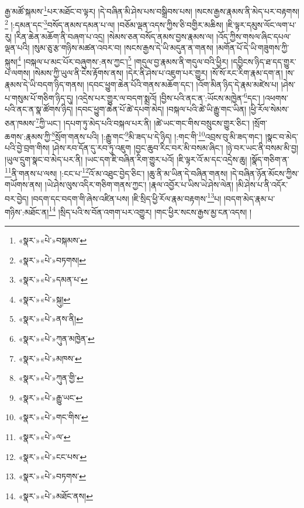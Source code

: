 རྒྱ་མཚོ་སྐམས་\footnote{«སྣར་»«པེ་»བསྐམས་}པར་མཐོང་བ་ལྟར། །དེ་བཞིན་མི་ཤེས་པས་བསྒྲིབས་པས། །སངས་རྒྱས་རྣམས་ནི་མེད་པར་བརྟགས།\footnote{«སྣར་»«པེ་»བཏགས།} །:དམན་དང་\footnote{«སྣར་»«པེ་»དམན་པ་}བསོད་ནམས་དམན་པ་ལ། །བཅོམ་ལྡན་འདས་ཀྱིས་ཅི་བགྱིར་མཆིས། །ཇི་ལྟར་དམུས་ལོང་ལག་པ་རུ། །རིན་ཆེན་མཆོག་ནི་བཞག་པ་འདྲ། །སེམས་ཅན་བསོད་ནམས་བྱས་རྣམས་ལ། །འོད་ཀྱིས་གསལ་ཞིང་དཔལ་ལྡན་པའི། །སུམ་ཅུ་རྩ་གཉིས་མཚན་འབར་བ། །སངས་རྒྱས་དེ་ཡི་མདུན་ན་གནས། །མགོན་པོ་དེ་ཡི་གཟུགས་ཀྱི་སྐུས།\footnote{«སྣར་»«པེ་»སྐུ།} །བསྐལ་པ་མང་པོར་བཞུགས་:ནས་ཀྱང་།\footnote{«སྣར་»«པེ་»ནས་ནི།} །གདུལ་བྱ་རྣམས་ནི་གདུལ་བའི་ཕྱིར། །དབྱིངས་ཉིད་ཐ་དད་གྱུར་པ་ལགས། །སེམས་ཀྱི་ཡུལ་ནི་ངེས་རྟོགས་ནས། །དེར་ནི་ཤེས་པ་འཇུག་པར་གྱུར། །སོ་སོ་རང་རིག་རྣམ་དག་ན། །ས་རྣམས་དེ་ཡི་བདག་ཉིད་གནས། །དབང་ཕྱུག་ཆེན་པོའི་གནས་མཆོག་དང་། །འོག་མིན་ཉིད་དེ་རྣམ་མཛེས་པ། །ཤེས་པ་གསུམ་པོ་གཅིག་ཉིད་དུ། །འདྲེས་པར་གྱུར་ལ་བདག་སྨྲའོ། །བྱིས་པའི་ནང་ན་:ཡོངས་མཁྱེན་\footnote{«སྣར་»«པེ་»ཀུན་མཁྱེན་}དང་། །འཕགས་པའི་ནང་ན་སྣ་ཚོགས་ཉིད། །དབང་ཕྱུག་ཆེན་པོ་ཚེ་དཔག་མེད། །བསྐལ་པའི་ཚེ་ཡི་རྒྱུ་གང་ཡིན། །ཕྱི་རོལ་སེམས་ཅན་ཁམས་\footnote{«སྣར་»«པེ་»མཁས་}ཀྱི་ཡང་། །དཔག་ཏུ་མེད་པའི་བསྐལ་པར་ནི། །ཚེ་ཡང་གང་གིས་བསྲུངས་གྱུར་ཅིང་། །སྲོག་ཆགས་:རྣམས་ཀྱི་\footnote{«སྣར་»«པེ་»ཀུན་གྱི་}སྲོག་གནས་པའི། །:རྒྱུ་གང་\footnote{«སྣར་»«པེ་»རྒྱུ་ཡང་}མི་ཟད་པ་དེ་ཉིད། །:གང་གི་\footnote{«སྣར་»«པེ་»གང་གིས་}འབྲས་བུ་མི་ཟད་གང་། །སྣང་བ་མེད་པའི་བྱེ་བྲག་གིས། །ཤེས་རབ་དོན་དུ་རབ་ཏུ་འཇུག །བྱང་ཆུབ་རིང་བར་མི་བསམ་ཞིང་། །ཉེ་བར་ཡང་ནི་བསམ་མི་བྱ། །ཡུལ་དྲུག་སྣང་བ་མེད་པར་ནི། །ཡང་དག་ཇི་བཞིན་རིག་གྱུར་པའོ། །ཇི་ལྟར་འོ་མ་དང་འདྲེས་ཆུ། །སྣོད་གཅིག་ན་\footnote{«སྣར་»«པེ་»ལ་}ནི་གནས་པ་ལས། །:ངང་པ་\footnote{«སྣར་»«པེ་»ངང་པས་}འོ་མ་འཐུང་བྱེད་ཅིང་། །ཆུ་ནི་མ་ཡིན་དེ་བཞིན་གནས། །དེ་བཞིན་ཉོན་མོངས་ཀྱིས་གཡོགས་ནས། །ཡེ་ཤེས་ལུས་འདིར་གཅིག་གནས་ཀྱང་། །རྣལ་འབྱོར་པ་ཡིས་ཡེ་ཤེས་ལེན། །མི་ཤེས་པ་ནི་འདོར་བར་བྱེད། །བདག་དང་བདག་གི་ཞེས་འཛིན་པས། །ཇི་སྲིད་ཕྱི་རོལ་རྣམ་བརྟགས་\footnote{«སྣར་»«པེ་»བཏགས་}པ། །བདག་མེད་རྣམ་པ་གཉིས་:མཐོང་ན།\footnote{«སྣར་»«པེ་»མཐོང་ནས།} །སྲིད་པའི་ས་བོན་འགག་པར་འགྱུར། །གང་ཕྱིར་སངས་རྒྱས་མྱ་ངན་འདས། །
